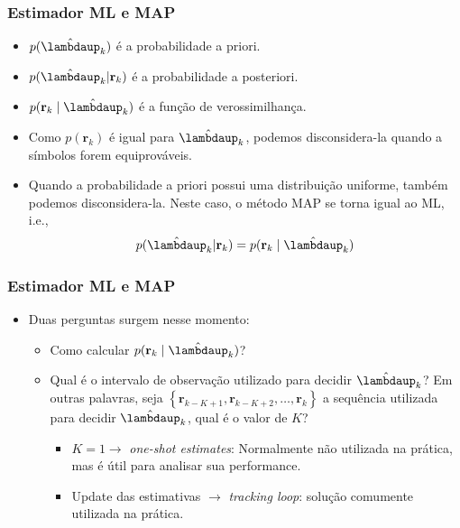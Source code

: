 \begin{frame}[t]
    \frametitle{Estimador ML e MAP}

    \begin{itemize}
        \item \(p(\hat{\boldsymbol{\lambdaup}}_k)\) é a probabilidade a priori.
        \item \(p(\hat{\boldsymbol{\lambdaup}}_k | \mathbf{r}_k)\) é a probabilidade a posteriori.
        \item \(p(\mathbf{r}_k \mid \hat{\boldsymbol{\lambdaup}}_k)\) é a função de verossimilhança.
    \end{itemize}

    \begin{itemize}
        \item Como \(p(\mathbf{r}_k)\) é igual para \(\hat{\boldsymbol{\lambdaup}}_k\), podemos disconsidera-la quando a símbolos forem equiprováveis.
        \item Quando a probabilidade a priori possui uma distribuição uniforme, também podemos disconsidera-la. Neste caso, o método MAP se torna igual ao ML, i.e.,
        \begin{align}
            p(\hat{\boldsymbol{\lambdaup}}_k | \mathbf{r}_k) = p(\mathbf{r}_k \mid \hat{\boldsymbol{\lambdaup}}_k)
        \end{align}
    \end{itemize}
\end{frame}

\begin{frame}[t]
    \frametitle{Estimador ML e MAP}
    \begin{itemize}
        \item Duas perguntas surgem nesse momento:
        \begin{itemize}
            \item Como calcular \(p(\mathbf{r}_k \mid \hat{\boldsymbol{\lambdaup}}_k)\)?
            \item Qual é o intervalo de observação utilizado para decidir \(\hat{\boldsymbol{\lambdaup}}_k\)? Em outras palavras, seja \(\left\{ \mathbf{r}_{k-K+1}, \mathbf{r}_{k-K+2}, \dots, \mathbf{r}_{k} \right\}\) a sequência utilizada para decidir \(\hat{\boldsymbol{\lambdaup}}_k\), qual é o valor de \(K\)?
            \begin{itemize}
                \item \(K=1 \rightarrow\) \textit{one-shot estimates}: Normalmente não utilizada na prática, mas é útil para analisar sua performance.
                \item Update das estimativas \(\rightarrow\) \textit{tracking loop}: solução comumente utilizada na prática.
            \end{itemize}
        \end{itemize}
    \end{itemize}
\end{frame}

